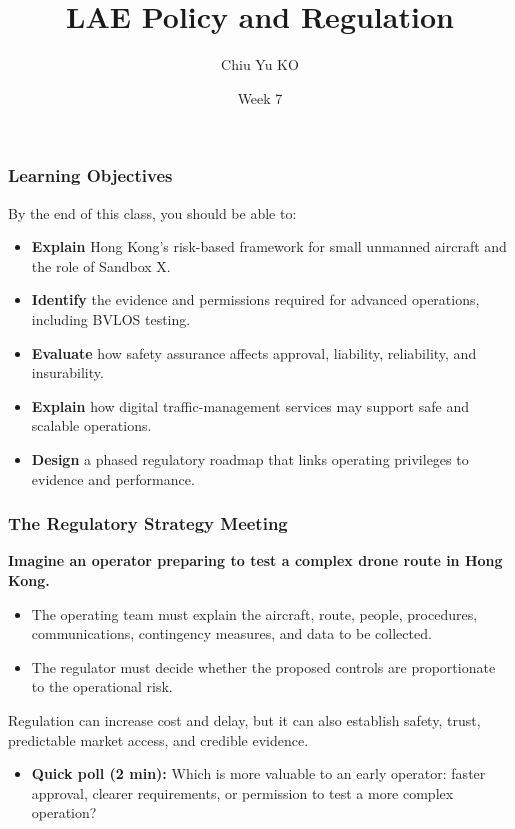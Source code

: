 \documentclass{beamer}
\begin{document}
\begin{frame}
  \title{LAE Policy and Regulation}
  \author{Chiu Yu KO}
  \date{Week 7}
  \titlepage
\end{frame}


\begin{frame}[t]
\frametitle{Learning Objectives}
By the end of this class, you should be able to:
\begin{itemize}
\item \textbf{Explain} Hong Kong's risk-based framework for small unmanned aircraft and the role of Sandbox X.
\item \textbf{Identify} the evidence and permissions required for advanced operations, including BVLOS testing.
\item \textbf{Evaluate} how safety assurance affects approval, liability, reliability, and insurability.
\item \textbf{Explain} how digital traffic-management services may support safe and scalable operations.
\item \textbf{Design} a phased regulatory roadmap that links operating privileges to evidence and performance.
\end{itemize}
\end{frame}

\begin{frame}[t]
\frametitle{The Regulatory Strategy Meeting}
\textbf{Imagine an operator preparing to test a complex drone route in Hong Kong.}
\begin{itemize}
\item The operating team must explain the aircraft, route, people, procedures, communications, contingency measures, and data to be collected.
\item The regulator must decide whether the proposed controls are proportionate to the operational risk.
\end{itemize}
\vspace{0.3cm}
Regulation can increase cost and delay, but it can also establish safety, trust, predictable market access, and credible evidence.
\begin{itemize}
\item \textbf{Quick poll (2 min):} Which is more valuable to an early operator: faster approval, clearer requirements, or permission to test a more complex operation?
\end{itemize}
\end{frame}
\end{document}
